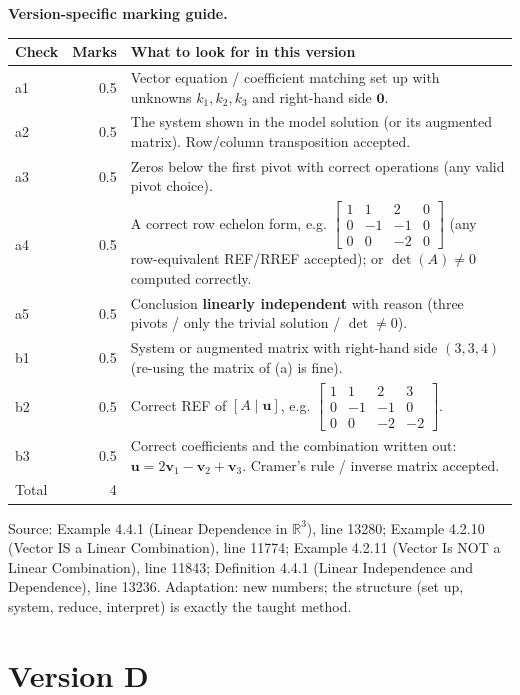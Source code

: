 \documentclass[11pt,a4paper]{article}
\newcommand{\Src}[1]{{\footnotesize\color{black!65}Source: #1}}
\begin{document}
\textbf{Version-specific marking guide.}\par
\begin{tabularx}{\linewidth}{@{}l r X@{}}\toprule Check & Marks & What to look for in this version\\\midrule
a1 & 0.5 & Vector equation / coefficient matching set up with unknowns $k_1,k_2,k_3$ and right-hand side $\mathbf{0}$.\\
a2 & 0.5 & The system shown in the model solution (or its augmented matrix). Row/column transposition accepted.\\
a3 & 0.5 & Zeros below the first pivot with correct operations (any valid pivot choice).\\
a4 & 0.5 & A correct row echelon form, e.g. $\left[\begin{array}{ccc|c} 1 & 1 & 2 & 0 \\ 0 & -1 & -1 & 0 \\ 0 & 0 & -2 & 0 \end{array}\right]$ (any row-equivalent REF/RREF accepted); or $\det(A)\neq0$ computed correctly.\\
a5 & 0.5 & Conclusion \textbf{linearly independent} with reason (three pivots / only the trivial solution / $\det\neq0$).\\
b1 & 0.5 & System or augmented matrix with right-hand side $(3,3,4)$ (re-using the matrix of (a) is fine).\\
b2 & 0.5 & Correct REF of $[A\mid\mathbf{u}]$, e.g. $\left[\begin{array}{ccc|c} 1 & 1 & 2 & 3 \\ 0 & -1 & -1 & 0 \\ 0 & 0 & -2 & -2 \end{array}\right]$.\\
b3 & 0.5 & Correct coefficients and the combination written out: $\mathbf{u}=2\mathbf{v}_1-\mathbf{v}_2+\mathbf{v}_3$. Cramer's rule / inverse matrix accepted.\\
\midrule Total & 4 & \\\bottomrule\end{tabularx}
\Src{Example 4.4.1 (Linear Dependence in $\mathbb{R}^3$), line 13280; Example 4.2.10 (Vector IS a Linear Combination), line 11774; Example 4.2.11 (Vector Is NOT a Linear Combination), line 11843; Definition 4.4.1 (Linear Independence and Dependence), line 13236. Adaptation: new numbers; the structure (set up, system, reduce, interpret) is exactly the taught method.}\par
\clearpage\section*{Version D}
\end{document}
